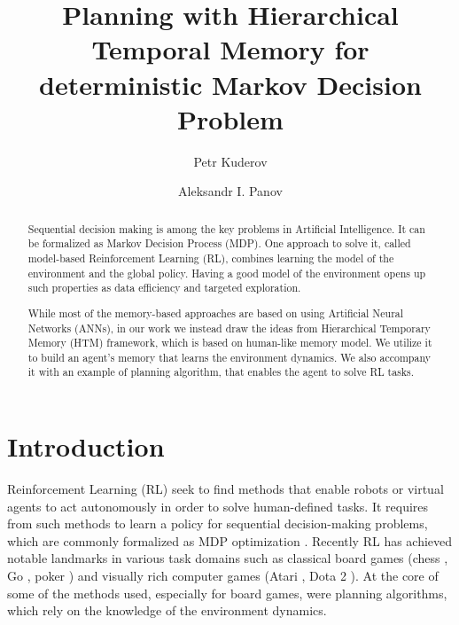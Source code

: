 \documentclass[runningheads]{llncs}
\begin{document}
\title {Planning with Hierarchical Temporal Memory for deterministic Markov Decision Problem}
\author {Petr Kuderov  \and Aleksandr I. Panov }

%

\maketitle

\begin{abstract}
  Sequential decision making is among the key problems in Artificial Intelligence. It can be formalized as Markov Decision Process (MDP). One approach to solve it, called model-based Reinforcement Learning (RL), combines learning the model of the environment and the global policy. Having a good model of the environment opens up such properties as data efficiency and targeted exploration.
  
  While most of the memory-based approaches are based on using Artificial Neural Networks (ANNs), in our work we instead draw the ideas from Hierarchical Temporary Memory (HTM) framework, which is based on human-like memory model. We utilize it to build an agent's memory that learns the environment dynamics. We also accompany it with an example of planning algorithm, that enables the agent to solve RL tasks.
\end{abstract}


\section{Introduction}

Reinforcement Learning (RL) seek to find methods that enable robots or virtual agents to act autonomously in order to solve human-defined tasks. It requires from such methods to learn a policy for sequential decision-making problems, which are commonly formalized as MDP optimization \cite{Puterman_1994}. Recently RL has achieved notable landmarks in various task domains such as classical board games (chess \cite{Campbell_Hoane_Hsu_2002_DeepBlue}, Go \cite{Silver_Go}, poker \cite{Brown_Sandholm_2017_Poker}) and visually rich computer games (Atari \cite{Mnih_2015_Atari}, Dota 2 \cite{openai_2019_dota}). At the core of some of the methods used, especially for board games, were planning algorithms, which rely on the knowledge of the environment dynamics.
\end{document}
